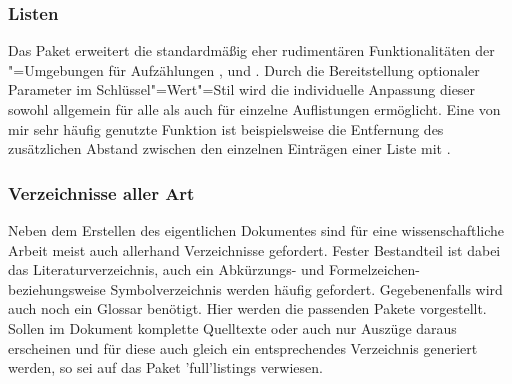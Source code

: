 \subsubsection{%
  Listen%
}
%
\begin{DeclarePackages}
  Das Paket  erweitert die standardmäßig eher rudimentären 
  Funktionalitäten der "=Umgebungen für Aufzählungen 
  ,  und .
  Durch die Bereitstellung optionaler Parameter im Schlüssel"=Wert"=Stil wird 
  die individuelle Anpassung dieser sowohl allgemein für alle als auch für 
  einzelne Auflistungen ermöglicht. Eine von mir sehr häufig genutzte Funktion 
  ist beispielsweise die Entfernung des zusätzlichen Abstand zwischen den 
  einzelnen Einträgen einer Liste mit .
\end{DeclarePackages}
%



\subsubsection{%
  Verzeichnisse aller Art%
}
%
Neben dem Erstellen des eigentlichen Dokumentes sind für eine wissenschaftliche 
Arbeit meist auch allerhand Verzeichnisse gefordert. Fester Bestandteil ist 
dabei das Literaturverzeichnis, auch ein Abkürzungs- und Formelzeichen- 
beziehungsweise Symbolverzeichnis werden häufig gefordert. Gegebenenfalls wird 
auch noch ein Glossar benötigt. Hier werden die passenden Pakete vorgestellt. 
Sollen im Dokument komplette Quelltexte oder auch nur Auszüge daraus erscheinen 
und für diese auch gleich ein entsprechendes Verzeichnis generiert werden, so 
sei auf das Paket \Package'full'{listings} verwiesen.

